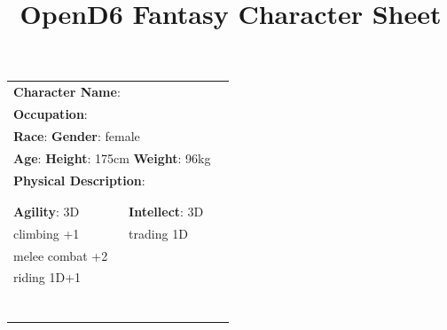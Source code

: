 \documentclass[10pt]{article}
\title{OpenD6 Fantasy Character Sheet}
\begin{document}
\pagestyle{fancy}
\fancyhf{}
\fancyfoot[R]{\thepage}
\renewcommand{\headrulewidth}{0pt}


\cleardoublepage
\begin{table}
\begin{tabular}{m{156pt} m{156pt} m{156pt}}
    \multicolumn{2}{l}{\textbf{Character Name}:  \hrulefill} \\
    \multicolumn{2}{l}{\textbf{Occupation}:  \hrulefill} \\
    \multicolumn{2}{l}{\textbf{Race}:  \hrulefill \hspace{1em} \textbf{Gender}: female \hrulefill} \\
    \multicolumn{2}{l}{\textbf{Age}:  \hrulefill \hspace{1em} \textbf{Height}: 175cm \hrulefill \hspace{1em}  \textbf{Weight}: 96kg \hrulefill } \\
    \multicolumn{2}{l}{\textbf{Physical Description}:  \hrulefill } \\
    \multicolumn{2}{l}{ \hrulefill } \\
 & & \\
\textbf{Agility}: 3D \hrulefill      & \textbf{Intellect}: 3D \hrulefill  &                             \\

climbing          +1 \hrulefill & trading           1D \hrulefill & \\

melee combat      +2 \hrulefill &  \hrulefill & \\

riding          1D+1 \hrulefill &  \hrulefill & \\

 \hrulefill &  \hrulefill & \\

 \hrulefill &  \hrulefill & \\

 \hrulefill &  \hrulefill & \\

 \hrulefill &  \hrulefill & \\

 \hrulefill &  \hrulefill & \\

 \hrulefill &  \hrulefill & \\

 \hrulefill &  \hrulefill & \\


\end{tabular}
\end{table}
\end{document}

